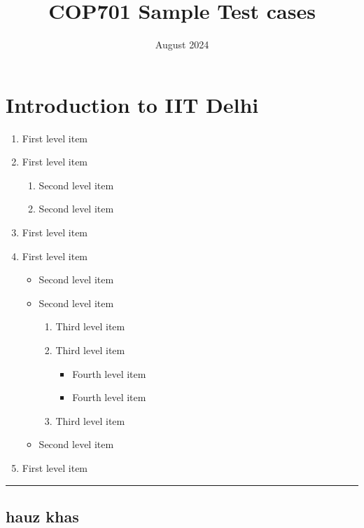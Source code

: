 \documentclass{article}
\title{COP701 Sample Test cases}
\date{August 2024}
\begin{document}
\section{Introduction to IIT Delhi}

\begin{enumerate}
    \item First level item
    \item First level item
    \begin{enumerate}
        \item Second level item
        \item Second level item
    \end{enumerate}
    \item First level item
    \item First level item
    \begin{itemize}
        \item Second level item
        \item Second level item
        \begin{enumerate}
            \item Third level item
            \item Third level item
            \begin{itemize}
              \item Fourth level item
              \item Fourth level item
            \end{itemize}
            \item Third level item
        \end{enumerate}
        \item Second level item
    \end{itemize}
    \item First level item
\end{enumerate}  

\hrule

\subsection{hauz khas}
\end{document}
